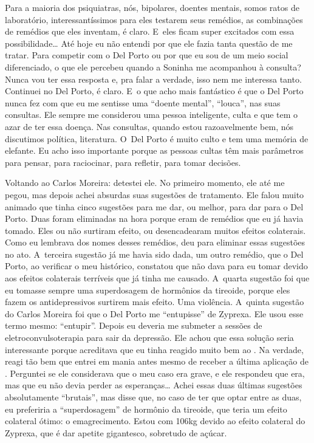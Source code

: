 Para a maioria dos psiquiatras, nós, bipolares, doentes mentais, somos
ratos de laboratório, interessantíssimos para eles testarem seus
remédios, as combinações de remédios que eles inventam, é claro. E~eles
ficam super excitados com essa possibilidade… Até hoje eu não
entendi por que ele fazia tanta questão de me tratar. Para competir com
o Del Porto ou por que eu sou de um meio social diferenciado, o que ele
percebeu quando a Soninha me acompanhou à consulta? Nunca vou ter essa
resposta e, pra falar a verdade, isso nem me interessa tanto. Continuei
no Del Porto, é claro. E~o que acho mais fantástico é que o Del Porto
nunca fez com que eu me sentisse uma ``doente mental'', ``louca'', nas suas
consultas. Ele sempre me considerou uma pessoa inteligente, culta e que
tem o azar de ter essa doença. Nas consultas, quando estou razoavelmente
bem, nós discutimos política, literatura. O~Del Porto é muito culto
e tem uma memória de elefante. Eu acho isso importante porque as pessoas
cultas têm mais parâmetros para pensar, para raciocinar, para refletir,
para tomar decisões. 

Voltando ao Carlos Moreira: detestei ele. No primeiro momento, ele até
me pegou, mas depois achei absurdas suas sugestões de tratamento. Ele falou
muito animado que tinha cinco sugestões para me dar, ou melhor, para dar 
para o Del Porto. Duas foram eliminadas na hora porque eram de remédios que
eu já havia tomado. Eles ou não surtiram efeito, ou desencadearam muitos 
efeitos colaterais. Como eu lembrava dos nomes desses remédios, deu para eliminar essas
sugestões no ato. A~terceira sugestão já me havia sido dada, um 
outro remédio, que o Del Porto, ao verificar o meu histórico, constatou
que não dava para eu tomar devido aos efeitos colaterais terríveis que
já tinha me causado. A~quarta sugestão foi que eu tomasse sempre uma
superdosagem de hormônios da tireoide, porque eles fazem os
antidepressivos surtirem mais efeito. Uma violência. A~quinta sugestão
do Carlos Moreira foi que o Del Porto me ``entupisse'' de Zyprexa. Ele
usou esse termo mesmo: ``entupir''. Depois eu deveria me submeter a
sessões de eletroconvulsoterapia para sair da depressão. Ele achou que
essa solução seria interessante porque acreditava que eu tinha reagido
muito bem ao . Na verdade, reagi tão bem que entrei em mania antes
mesmo de receber a última aplicação de . Perguntei se ele considerava
que o meu caso era grave, e ele respondeu que era, mas que eu não devia
perder as esperanças… Achei essas duas últimas sugestões
absolutamente ``brutais'', mas disse que, no caso de ter que optar entre
as duas, eu preferiria a ``superdosagem'' de hormônio da tireoide, que
teria um efeito colateral ótimo: o emagrecimento. Estou com 106kg devido
ao efeito colateral do Zyprexa, que é dar apetite gigantesco, sobretudo
de açúcar.

